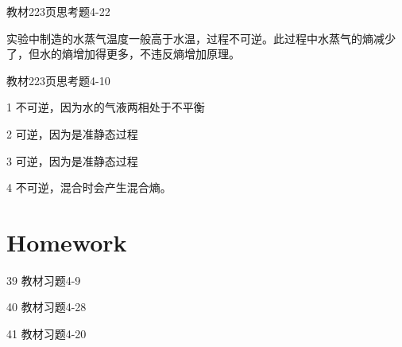 \documentclass[CJK]{beamer}
\begin{document}
\begin{frame}
  \bch
  教材223页思考题4-22
  \ech
\end{frame}


\begin{frame}
  \bch
  实验中制造的水蒸气温度一般高于水温，过程不可逆。此过程中水蒸气的熵减少了，但水的熵增加得更多，不违反熵增加原理。
  \ech
\end{frame}

\begin{frame}
  \bch
  教材223页思考题4-10
  \ech
\end{frame}


\begin{frame}
  \bch
  \bitem
\item[1]{不可逆，因为水的气液两相处于不平衡}
\item[2]{可逆，因为是准静态过程}
\item[3]{可逆，因为是准静态过程}
\item[4]{不可逆，混合时会产生混合熵。}
  \eitem
  \ech
\end{frame}

\section{Homework}

\begin{frame}
  \bch
  {\small 
  \bitem
\item[39]{教材习题4-9}
\item[40]{教材习题4-28}
\item[41]{教材习题4-20}
  \eitem
  }
  \ech
\end{frame}
\end{document}
